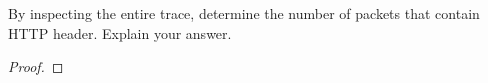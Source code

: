 \documentclass[../../main.tex]{subfiles}
\begin{document}
\begin{wts}
By inspecting the entire trace, determine the number of packets that contain HTTP header. Explain your answer.
\end{wts}
\begin{proof}

\end{proof}
\end{document}
